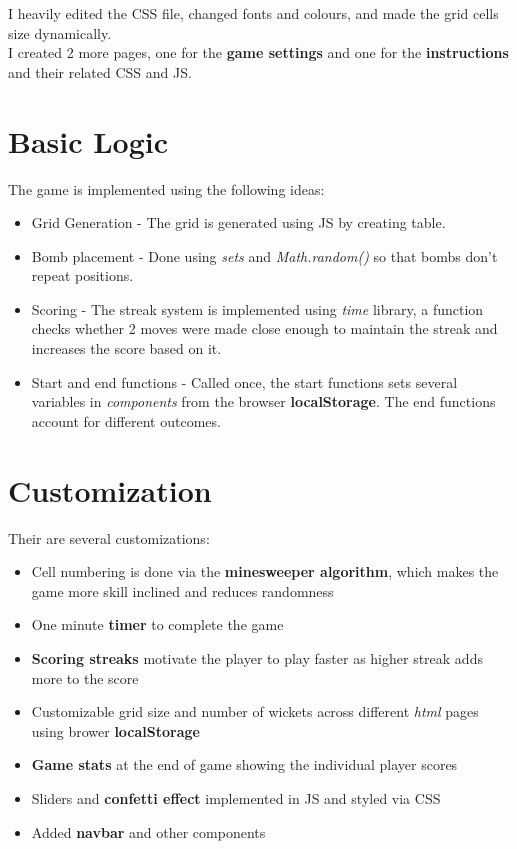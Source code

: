 \documentclass{article}
\begin{document}
I heavily edited the CSS file, changed fonts and colours, and made the grid cells size dynamically. \\

I created 2 more pages, one for the \textbf{game settings} and one for the \textbf{instructions} and their related CSS and JS.

\newpage

\section{Basic Logic}
The game is implemented using the following ideas: \\ 
\begin{itemize}
\item{Grid Generation - The grid is generated using JS by creating table.}
\item{Bomb placement - Done using \textit{sets} and \textit{Math.random()} so that bombs don't repeat positions.}
\item{Scoring - The streak system is implemented using \textit{time} library, a function checks whether 2 moves were made close enough to maintain the streak and increases the score based on it.}
\item{Start and end functions - Called once, the start functions sets several variables in \textit{components} from the browser \textbf{localStorage}. The end functions account for different outcomes.}
\end{itemize}


\section{Customization}
Their are several customizations: \\ 
\begin{itemize}
\item{Cell numbering is done via the \textbf{minesweeper algorithm}, which makes the game more skill inclined and reduces randomness}
\item{One minute \textbf{timer} to complete the game}
\item{\textbf{Scoring streaks} motivate the player to play faster as higher streak adds more to the score}
\item{Customizable grid size and number of wickets across different \textit{html} pages using brower \textbf{localStorage}}
\item{\textbf{Game stats} at the end of game showing the individual player scores}
\item{Sliders and \textbf{confetti effect} implemented in JS and styled via CSS}
\item{Added \textbf{navbar} and other components}

\end{itemize}
\end{document}
